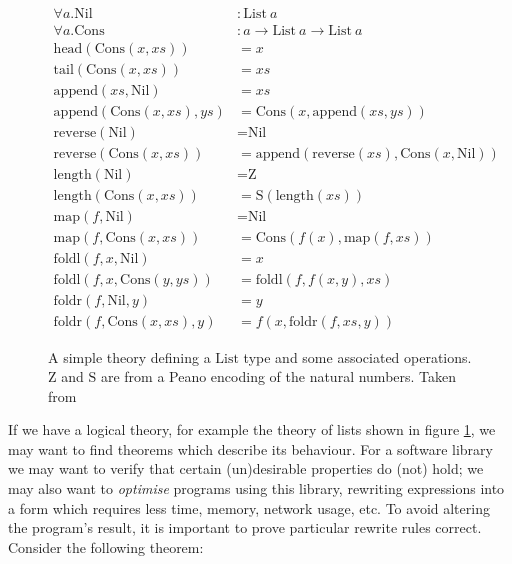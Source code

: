 \begin{figure}
  \begin{equation*}
    \begin{split}
      \forall a. \text{Nil} &: \text{List} \  a \\
      \forall a. \text{Cons} &: a \rightarrow \text{List} \  a \rightarrow \text{List} \ a \\
      \text{head}(\text{Cons}(x, xs)) &= x \\
      \text{tail}(\text{Cons}(x, xs)) &= xs \\
      \text{append}(xs, \text{Nil}) &= xs \\
      \text{append}(\text{Cons}(x, xs), ys) &= \text{Cons}(x, \text{append}(xs, ys)) \\
      \text{reverse}(\text{Nil}) &= \text{Nil} \\
      \text{reverse}(\text{Cons}(x, xs)) &= \text{append}(\text{reverse}(xs), \text{Cons}(x, \text{Nil})) \\
      \text{length}(\text{Nil}) &= \text{Z} \\
      \text{length}(\text{Cons}(x, xs)) &= \text{S} (\text{length}(xs)) \\
      \text{map}(f, \text{Nil}) &= \text{Nil} \\
      \text{map}(f, \text{Cons}(x, xs)) &= \text{Cons}(f(x), \text{map}(f, xs)) \\
      \text{foldl}(f, x, \text{Nil}) &= x \\
      \text{foldl}(f, x, \text{Cons}(y, ys)) &= \text{foldl}(f, f(x, y), xs) \\
      \text{foldr}(f, \text{Nil}, y) &= y \\
      \text{foldr}(f, \text{Cons}(x, xs), y) &= f(x, \text{foldr}(f, xs, y))
    \end{split}
  \end{equation*}
  \caption{A simple theory defining a $\text{List}$ type and some associated
    operations. $\text{Z}$ and $\text{S}$ are from a Peano encoding of the natural numbers.
    Taken from \cite{Johansson.Dixon.Bundy:conjecture-generation}}
  \label{figure:list_theory}
\end{figure}

If we have a logical theory, for example the theory of lists shown in figure
\ref{figure:list_theory}, we may want to find theorems which describe its
behaviour. For a software library we may want to verify that certain
(un)desirable properties do (not) hold; we may also want to \emph{optimise}
programs using this library, rewriting expressions into a form which requires
less time, memory, network usage, etc. To avoid altering the program's result,
it is important to prove particular rewrite rules correct. Consider the
following theorem:

